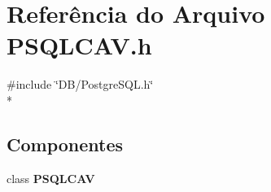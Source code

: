 \section{Referência do Arquivo P\+S\+Q\+L\+C\+A\+V.\+h}
\label{_p_s_q_l_c_a_v_8h}
{\ttfamily \#include \char`\"{}D\+B/\+Postgre\+S\+Q\+L.\+h\char`\"{}}\\*
\subsection*{Componentes}
\begin{DoxyCompactItemize}
\item 
class {\bf P\+S\+Q\+L\+C\+AV}
\end{DoxyCompactItemize}
